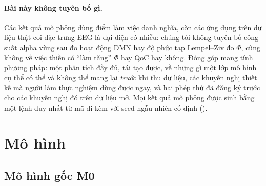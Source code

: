 \paragraph{Bài này không tuyên bố gì.} Các kết quả mô phỏng dùng điểm làm việc danh nghĩa, còn các ứng dụng trên dữ liệu thật coi đặc trưng EEG là đại diện có nhiễu: chúng tôi không tuyên bố công suất alpha vùng sau đo hoạt động DMN hay độ phức tạp Lempel--Ziv đo $\Phi$, cũng không về việc thiền có ``làm tăng'' $\Phi$ hay QoC hay không. Đóng góp mang tính phương pháp: một phân tích đầy đủ, tái tạo được, về những gì một lớp mô hình cụ thể có thể và không thể mang lại \emph{trước} khi thu dữ liệu, các khuyến nghị thiết kế mà người làm thực nghiệm dùng được ngay, và hai phép thử đã đăng ký trước cho các khuyến nghị đó trên dữ liệu mở. Mọi kết quả mô phỏng được sinh bằng một lệnh duy nhất từ mã đi kèm với seed ngẫu nhiên cố định ().

\section{Mô hình}
\label{sec:model}

\subsection{Mô hình gốc M0}
\label{sec:m0}

